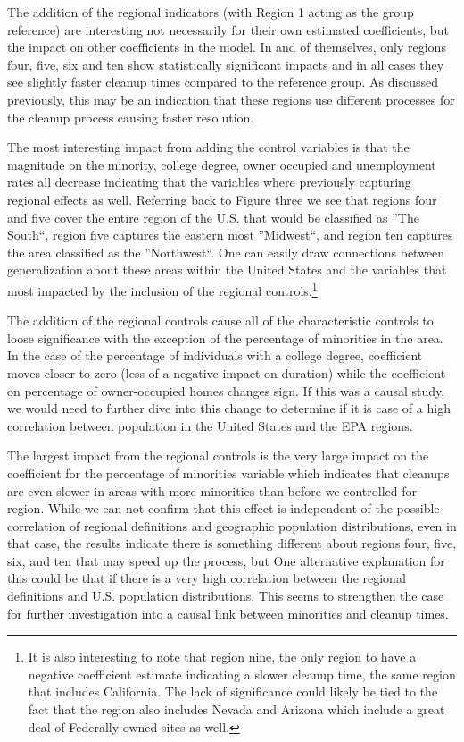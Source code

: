 \documentclass[12pt]{article}
\begin{document}
{The addition of the regional indicators (with Region 1 acting as the group reference) are interesting not necessarily for their own estimated coefficients, but the impact on other coefficients in the model. In and of themselves, only regions four, five, six and ten show statistically significant impacts and in all cases they see slightly faster cleanup times compared to the reference group. As discussed previously, this may be an indication that these regions use different processes for the cleanup process causing faster resolution. 

The most interesting impact from adding the control variables is that the magnitude on the minority, college degree, owner occupied and unemployment rates all decrease indicating that the variables where previously capturing regional effects as well. Referring back to Figure three we see that regions four and five cover the entire region of the U.S. that would be classified as ''The South``, region five captures the eastern most ''Midwest``, and region ten captures the area classified as the ''Northwest``. One can easily draw connections between generalization about these areas within the United States and the variables that most impacted by the inclusion of the regional controls.\footnote{It is also interesting to note that region nine, the only region to have a negative coefficient estimate indicating a slower cleanup time, the same region that includes California. The lack of significance could likely be tied to the fact that the region also includes Nevada and Arizona which include a great deal of Federally owned sites as well.}

The addition of the regional controls cause all of the characteristic controls to loose significance with the exception of the percentage of minorities in the area. In the case of the percentage of individuals with a college degree, coefficient moves closer to zero (less of a negative impact on duration) while the coefficient on percentage of owner-occupied homes changes sign. If this was a causal study, we would need to further dive into this change to determine if it is case of a high correlation between population in the United States and the EPA regions. 

The largest impact from the regional controls is the very large impact on the coefficient for the percentage of minorities variable which indicates that cleanups are even slower in areas with more minorities than before we controlled for region. While we can not confirm that this effect is independent of the possible correlation of regional definitions and geographic population distributions, even in that case, the results indicate there is something different about regions four, five, six, and ten that may speed up the process, but One alternative explanation for this could be that if there is a very high correlation between the regional definitions and U.S. population distributions, This seems to strengthen the case for further investigation into a causal link between minorities and cleanup times. 

}
\end{document}
